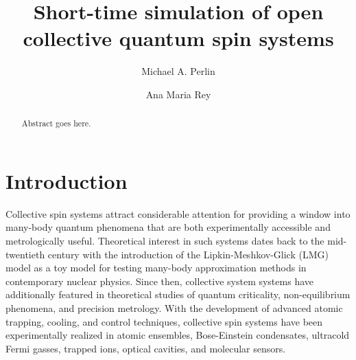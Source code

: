 \documentclass[aps,11pt,notitlepage,nofootinbib,longbibliography]{revtex4-1}
\newcommand{\1}{\mathds{1}}
\begin{document}
\title{Short-time simulation of open collective quantum spin systems}

\author{Michael A. Perlin}
\author{Ana Maria Rey}

\begin{abstract}
  Abstract goes here.
\end{abstract}

\maketitle


\section{Introduction}

Collective spin systems attract considerable attention for providing a
window into many-body quantum phenomena that are both experimentally
accessible\cite{takano2009spin, chen2010heralded,
  riedel2010atomchipbased, gross2010nonlinear, martin2013quantum,
  bohnet2016quantum, hosten2016quantum, norcia2018cavitymediated,
  jones2009magnetic} and metrologically
useful\cite{riedel2010atomchipbased, gross2010nonlinear,
  hosten2016quantum, jones2009magnetic, zhong2010simplified,
  huang2015quantum, agarwal1997atomic, lau2014proposal,
  wineland1992spin, kitagawa1993squeezed, ma2011quantum}.  Theoretical
interest in such systems dates back to the mid-twentieth century with
the introduction of the Lipkin-Meshkov-Glick (LMG) model as a toy
model for testing many-body approximation methods in contemporary
nuclear physics\cite{lipkin1965validity, meshkov1965validity,
  glick1965validity}.  Since then, collective system systems have
additionally featured in theoretical studies of quantum
criticality\cite{latorre2005entanglement, alcalde2007functional,
  morrison2008collective, sarandy2009classical, wang2012quantum,
  majd2014lmg}, non-equilibrium
phenomena\cite{morrison2008dissipationdriven,
  bhattacherjee2014nonequilibrium, klinder2015dynamical,
  zhiqiang2017nonequilibrium, smale2018observation}, and precision
metrology\cite{wineland1992spin, kitagawa1993squeezed, ma2011quantum,
  zhong2010simplified}.  With the development of advanced atomic
trapping, cooling, and control techniques, collective spin systems
have been experimentally realized in atomic
ensembles\cite{takano2009spin, chen2010heralded}, Bose-Einstein
condensates\cite{riedel2010atomchipbased, gross2010nonlinear},
ultracold Fermi gasses\cite{martin2013quantum}, trapped
ions\cite{bohnet2016quantum}, optical cavities\cite{hosten2016quantum,
  norcia2018cavitymediated}, and molecular
sensors\cite{jones2009magnetic}.
\end{document}

